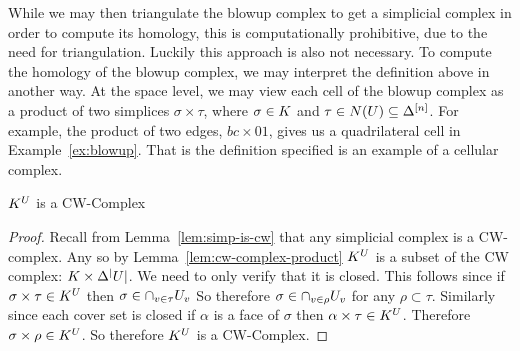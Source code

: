 While we may then triangulate the blowup complex to get a simplicial complex in order 
to compute its homology, this is computationally prohibitive, due to the need for triangulation. 
Luckily this approach is also not necessary. To compute the homology of the blowup complex, we may interpret the definition 
above in another way.  At the space level, we may view each cell of the blowup complex as a product 
of two simplices $\sigma \times \tau$, where $\sigma \in K$ and $\tau \in N(U) \subseteq \Delta^{[n]}$.  
For example, the product of two edges, $bc \times 01$, gives us a quadrilateral cell in Example~\ref{ex:blowup}.  
That is the definition specified is an example of a cellular complex. 
\begin{lemma}
$K^U$ is a CW-Complex
\end{lemma}
\begin{proof}
Recall from Lemma~\ref{lem:simp-is-cw} that any simplicial complex is a CW-complex. Any so by Lemma~\ref{lem:cw-complex-product} $K^U$ is a subset of the CW complex: $K \times \Delta^|U|$. We need to only verify that it is closed. This follows since if $\sigma \times \tau \in K^U$ then $\sigma \in \cap_{v \in \tau} U_{v}$ So therefore $\sigma \in \cap_{v \in \rho} U_v$ for any $\rho \subset \tau$. Similarly since each cover set is closed if $\alpha$ is a face of $\sigma$ then $\alpha \times \tau \in K^U$.  Therefore $\sigma \times \rho \in K^U$. So therefore $K^U$ is a CW-Complex.
\end{proof}


